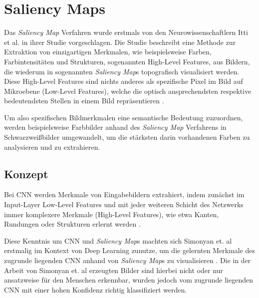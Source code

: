 \chapter{Saliency Maps}
\label{cha:saliency}
Das \textit{Saliency Map} Verfahren wurde erstmals von den Neurowissenschaftlern Itti et al. \cite{itti_model_1998} in ihrer Studie vorgeschlagen. Die Studie beschreibt eine Methode zur Extraktion von einzigartigen Merkmalen, wie beispielsweise Farben, Farbintensitäten und Strukturen, sogenannten High-Level Features, aus Bildern, die wiederum in sogenannten \textit{Saliency Map}s topografisch visualisiert werden. Diese High-Level Features sind nichts anderes als spezifische Pixel im Bild auf Mikroebene (Low-Level Features), welche die optisch ansprechendsten respektive bedeutendsten Stellen in einem Bild repräsentieren \cite{itti_model_1998}. 

Um also spezifischen Bildmerkmalen eine semantische Bedeutung zuzuordnen, werden beispielsweise Farbbilder anhand des \textit{Saliency Map} Verfahrens in Schwarzweißbilder umgewandelt, um die stärksten darin vorhandenen Farben zu analysieren und zu extrahieren.

\section{Konzept}
\label{cha:saliency_konz}
Bei \ac{CNN} werden Merkmale von Eingabebildern extrahiert, indem zunächst im Input-Layer Low-Level Features und mit jeder weiteren Schicht des Netzwerks immer komplexere Merkmale (High-Level Features), wie etwa Kanten, Rundungen oder Strukturen erlernt werden \cite{stanford_unsupervised_tutorial}.

Diese Kenntnis um \ac{CNN} und \textit{Saliency Map}s machten sich Simonyan et. al erstmalig im Kontext von Deep Learning zunutze, um die gelernten Merkmale des zugrunde liegenden \ac{CNN} anhand von \textit{Saliency Map}s zu visualisieren \cite{simonyan_deep_2013}. 
Die in der Arbeit von Simonyan et. al erzeugten Bilder sind hierbei nicht oder nur ansatzweise für den Menschen erkennbar, wurden jedoch vom zugrunde liegenden \ac{CNN} mit einer hohen Konfidenz richtig klassifiziert werden.
~\newline

